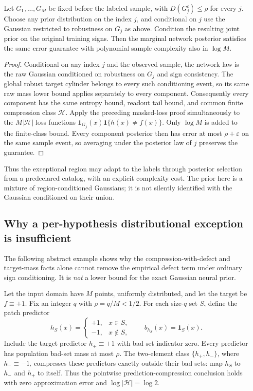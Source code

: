 \begin{corollary}
\label{cor:trusted-catalog}
Let $G_1,\ldots,G_M$ be fixed before the labeled sample, with
$D(G_j^c)\le\rho$ for every $j$. Choose any prior distribution on the
index $j$, and conditional on $j$ use the Gaussian restricted to robustness
on $G_j$ as above. Condition the resulting joint prior on the original
training signs. Then the marginal network posterior satisfies the same
error guarantee with polynomial sample complexity also in $\log M$.
\end{corollary}
\begin{proof}
Conditional on any index $j$ and the observed sample, the network law is
the raw Gaussian conditioned on robustness on $G_j$ and sign consistency.
The global robust target cylinder belongs to every such conditioning event,
so its same raw mass lower bound applies separately to every component.
Consequently every component has the same entropy bound, readout tail
bound, and common finite compression class $\mathcal H$.
Apply the preceding masked-loss proof simultaneously to the $M|\mathcal H|$
loss functions $\mathbf1_{G_j}(x)\mathbf1\{h(x)\ne f(x)\}$.
Only $\log M$ is added to the finite-class bound. Every component posterior
then has error at most $\rho+\varepsilon$ on the same sample event, so
averaging under the posterior law of $j$ preserves the guarantee.
\end{proof}

Thus the exceptional region may adapt to the labels through posterior
selection from a predeclared catalog, with an explicit complexity cost.
The prior here is a mixture of region-conditioned Gaussians; it is not
silently identified with the Gaussian conditioned on their union.

\subsection{Why a per-hypothesis distributional exception is insufficient}
\label{sec:patch-obstruction}

The following abstract example shows why the compression-with-defect and
target-mass facts alone cannot remove the empirical defect term under
ordinary sign conditioning. It is \emph{not} a lower bound for the exact
Gaussian neural prior.

Let the input domain have $M$ points, uniformly distributed, and let the
target be $f\equiv+1$. Fix an integer $q$ with $\rho=q/M<1/2$. For each
size-$q$ set $S$, define the patch predictor
\[
 h_S(x)=\begin{cases}+1,&x\in S,\\-1,&x\notin S,\end{cases}
 \qquad b_{h_S}(x)=\mathbf1_S(x).
\]
Include the target predictor $h_+\equiv+1$ with bad-set indicator zero.
Every predictor has population bad-set mass at most $\rho$.
The two-element class $\{h_+,h_-\}$, where $h_-\equiv-1$, compresses these
predictors exactly outside their bad sets: map $h_S$ to $h_-$ and $h_+$
to itself. Thus the pointwise prediction-compression conclusion holds with
zero approximation error and $\log|\mathcal H|=\log2$.

